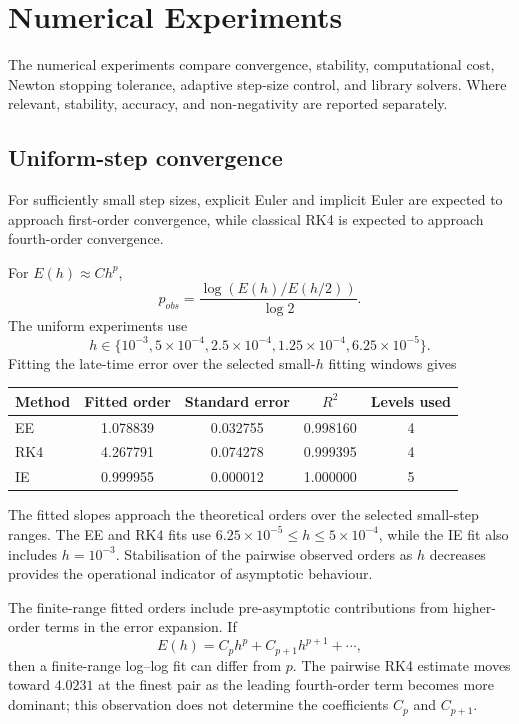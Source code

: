 \section{Numerical Experiments}
The numerical experiments compare convergence, stability, computational cost, Newton stopping tolerance, adaptive step-size control, and library solvers. Where relevant, stability, accuracy, and non-negativity are reported separately.
\subsection{Uniform-step convergence}
For sufficiently small step sizes, explicit Euler and implicit Euler are expected to approach first-order convergence, while classical RK4 is expected to approach fourth-order convergence.

For $E(h)\approx Ch^p$,
\[
p_{obs}=\frac{\log(E(h)/E(h/2))}{\log2}.
\]
The uniform experiments use
\[
h\in\{10^{-3},5\times10^{-4},2.5\times10^{-4},
1.25\times10^{-4},6.25\times10^{-5}\}.
\]
Fitting the late-time error over the selected small-$h$ fitting windows gives
\begin{center}
\begin{tabular}{lcccc}
\toprule
Method&Fitted order&Standard error&$R^2$&Levels used\\
\midrule
EE&1.078839&0.032755&0.998160&4\\
RK4&4.267791&0.074278&0.999395&4\\
IE&0.999955&0.000012&1.000000&5\\
\bottomrule
\end{tabular}
\end{center}
The fitted slopes approach the theoretical orders over the selected small-step ranges. The EE and RK4 fits use $6.25\times10^{-5}\le h\le5\times10^{-4}$, while the IE fit also includes $h=10^{-3}$. Stabilisation of the pairwise observed orders as $h$ decreases provides the operational indicator of asymptotic behaviour.

The finite-range fitted orders include pre-asymptotic contributions from higher-order terms in the error expansion. If
\[
E(h)=C_p h^p+C_{p+1}h^{p+1}+\cdots,
\]
then a finite-range log--log fit can differ from $p$. The pairwise RK4 estimate moves toward $4.0231$ at the finest pair as the leading fourth-order term becomes more dominant; this observation does not determine the coefficients $C_p$ and $C_{p+1}$.

